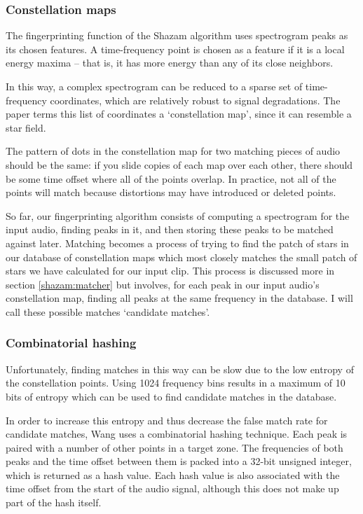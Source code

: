 \documentclass[12pt,a4paper,twoside,openright]{report}
\begin{document}
\subsubsection{Constellation maps}

The fingerprinting function of the Shazam algorithm uses spectrogram peaks as its chosen features. A time-frequency point is chosen as a feature if it is a local energy maxima -- that is, it has more energy than any of its close neighbors.

In this way, a complex spectrogram can be reduced to a sparse set of time-frequency coordinates, which are relatively robust to signal degradations. The paper terms this list of coordinates a `constellation map', since it can resemble a star field. 

The pattern of dots in the constellation map for two matching pieces of audio should be the same: if you slide copies of each map over each other, there should be some time offset where all of the points overlap. In practice, not all of the points will match because distortions may have introduced or deleted points.

So far, our fingerprinting algorithm consists of computing a spectrogram for the input audio, finding peaks in it, and then storing these peaks to be matched against later. Matching becomes a process of trying to find the patch of stars in our database of constellation maps which most closely matches the small patch of stars we have calculated for our input clip. This process is discussed more in section \ref{shazam:matcher} but involves, for each peak in our input audio's constellation map, finding all peaks at the same frequency in the database. I will call these possible matches `candidate matches'.

\subsubsection{Combinatorial hashing}

Unfortunately, finding matches in this way can be slow due to the low entropy of the constellation points. Using 1024 frequency bins results in a maximum of 10 bits of entropy which can be used to find candidate matches in the database. 

In order to increase this entropy and thus decrease the false match rate for candidate matches, Wang uses a combinatorial hashing technique. Each peak is paired with a number of other points in a target zone. The frequencies of both peaks and the time offset between them is packed into a 32-bit unsigned integer, which is returned as a hash value. Each hash value is also associated with the time offset from the start of the audio signal, although this does not make up part of the hash itself.
\end{document}
